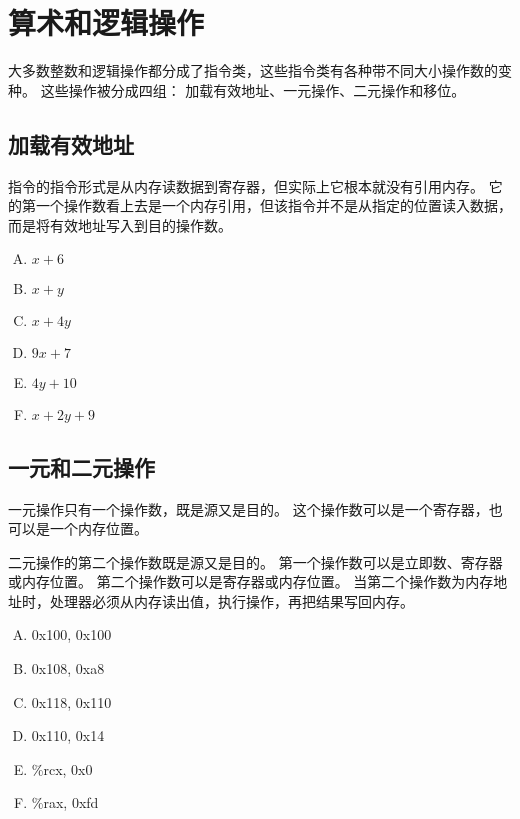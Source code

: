 
\section{算术和逻辑操作}
{
    大多数整数和逻辑操作都分成了指令类，这些指令类有各种带不同大小操作数的变种。
    这些操作被分成四组：
    加载有效地址、一元操作、二元操作和移位。

    \subsection{加载有效地址}
    {
        指令的指令形式是从内存读数据到寄存器，但实际上它根本就没有引用内存。
        它的第一个操作数看上去是一个内存引用，但该指令并不是从指定的位置读入数据，而是将有效地址写入到目的操作数。

        \begin{practicec}
            \begin{enumerate}[A.]
                \item $x + 6$
                \item $x + y$
                \item $x + 4y$
                \item $9x + 7$
                \item $4y + 10$
                \item $x + 2y + 9$
            \end{enumerate}
        \end{practicec}

        \begin{practicec}
        \end{practicec}
    }

    \subsection{一元和二元操作}
    {
        一元操作只有一个操作数，既是源又是目的。
        这个操作数可以是一个寄存器，也可以是一个内存位置。

        二元操作的第二个操作数既是源又是目的。
        第一个操作数可以是立即数、寄存器或内存位置。
        第二个操作数可以是寄存器或内存位置。
        当第二个操作数为内存地址时，处理器必须从内存读出值，执行操作，再把结果写回内存。

        \begin{practicec}
            \begin{enumerate}[A.]
                \item 0x100, 0x100
                \item 0x108, 0xa8
                \item 0x118, 0x110
                \item 0x110, 0x14
                \item \%rcx, 0x0
                \item \%rax, 0xfd
            \end{enumerate}
        \end{practicec}
    }

}
